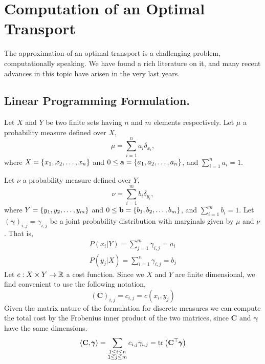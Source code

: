 \chapter{Computation of an Optimal Transport}
The approximation of an optimal transport is a challenging problem, computationally speaking. We have found a rich literature on it, and many recent advances in this topic have arisen in the very last years. 
\section{Linear Programming Formulation.}
Let $X$ and $Y$ be two finite sets having $n$ and $m$ elements respectively. Let $\mu$ a probability measure defined over $X$,
\begin{equation}
	\mu=\sum_{i=1}^{n} a_i \delta_{x_i},
\end{equation} 
where $X=\left\lbrace x_1, x_2, \dots, x_n \right\rbrace$ and $0\leq\mathbf{a}=\left\lbrace a_1, a_2, \dots, a_n \right\rbrace$, and $\sum_{i=1}^{n}a_i=1$.

Let $\nu$ a probability measure defined over $Y$,
\begin{equation}
	\nu=\sum_{i=1}^{m} b_i \delta_{y_i},
\end{equation}
where $Y=\left\lbrace y_1, y_2, \dots, y_m \right\rbrace$ and $0\leq\mathbf{b}=\left\lbrace b_1, b_2, \dots, b_m \right\rbrace$, and $\sum_{i=1}^{m}b_i=1$. 
Let $(\pmb{\gamma})_{i,j}=\gamma_{i,j}$ be a joint probability distribution with marginals given by $\mu$ and $\nu$. That is,
\begin{align}
	P(x_i|Y)=\sum_{j=1}^{m}\gamma_{i,j}=a_i\\ P(y_j|X)=\sum_{i=1}^{n}\gamma_{i,j}=b_j
\end{align}
Let $c:X\times Y \rightarrow \mathbb{R}$ a cost function. Since we $X$ and $Y$ are finite dimensional, we find convenient to use the following notation,
\begin{equation}
	(\mathbf C)_{i,j}=c_{i,j}=c(x_i, y_j)
\end{equation}
Given the matrix nature of the formulation for discrete measures we can compute the total cost by the Frobenius inner product of the two matrices, since $\mathbf{C}$ and $\pmb{\gamma}$ have the same dimensions.
\begin{equation}
	\left\langle \mathbf{C}, \pmb{\gamma} \right\rangle=\sum_{\substack{1\leq i \leq n \\ 1\leq j\leq m}}c_{i,j}\gamma_{i,j}=\mathrm{tr}\left( \mathbf{C}^\top\pmb{\gamma} \right)
\end{equation}
